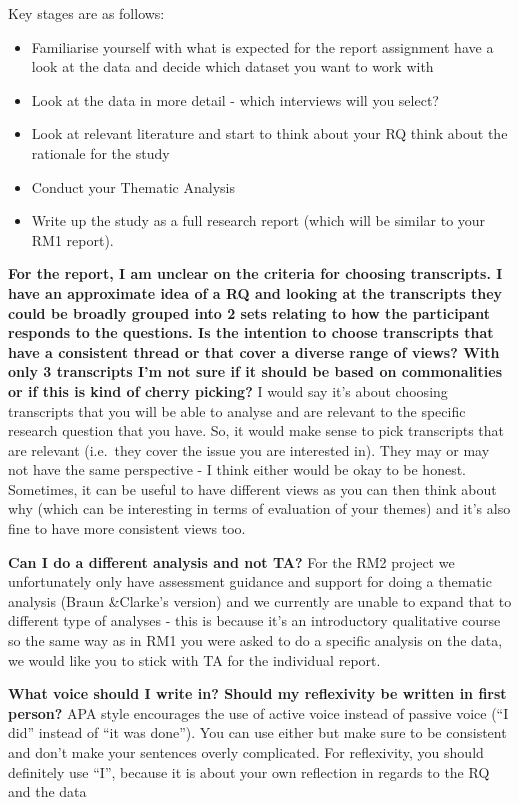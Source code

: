 \documentclass[
  english,
  letterpaper,
  DIV=11,
  numbers=noendperiod]{scrreprt}
\providecommand{\tightlist}{%
  \setlength{\itemsep}{0pt}\setlength{\parskip}{0pt}}
\begin{document}
Key stages are as follows:

\begin{itemize}
\tightlist
\item
  Familiarise yourself with what is expected for the report assignment
  have a look at the data and decide which dataset you want to work with
\item
  Look at the data in more detail - which interviews will you select?
\item
  Look at relevant literature and start to think about your RQ think
  about the rationale for the study
\item
  Conduct your Thematic Analysis
\item
  Write up the study as a full research report (which will be similar to
  your RM1 report).
\end{itemize}

\textbf{For the report, I am unclear on the criteria for choosing
transcripts. I have an approximate idea of a RQ and looking at the
transcripts they could be broadly grouped into 2 sets relating to how
the participant responds to the questions. Is the intention to choose
transcripts that have a consistent thread or that cover a diverse range
of views? With only 3 transcripts I'm not sure if it should be based on
commonalities or if this is kind of cherry picking?} I would say it's
about choosing transcripts that you will be able to analyse and are
relevant to the specific research question that you have. So, it would
make sense to pick transcripts that are relevant (i.e.~they cover the
issue you are interested in). They may or may not have the same
perspective - I think either would be okay to be honest. Sometimes, it
can be useful to have different views as you can then think about why
(which can be interesting in terms of evaluation of your themes) and
it's also fine to have more consistent views too.

\textbf{Can I do a different analysis and not TA?} For the RM2 project
we unfortunately only have assessment guidance and support for doing a
thematic analysis (Braun \&Clarke's version) and we currently are unable
to expand that to different type of analyses - this is because it's an
introductory qualitative course so the same way as in RM1 you were asked
to do a specific analysis on the data, we would like you to stick with
TA for the individual report.

\textbf{What voice should I write in? Should my reflexivity be written
in first person?} APA style encourages the use of active voice instead
of passive voice (``I did'' instead of ``it was done''). You can use
either but make sure to be consistent and don't make your sentences
overly complicated. For reflexivity, you should definitely use ``I'',
because it is about your own reflection in regards to the RQ and the
data
\end{document}
